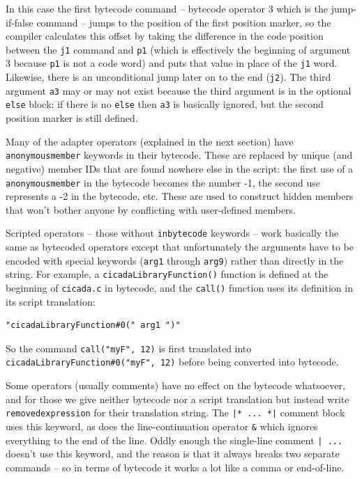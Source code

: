 \documentclass{article}
\newenvironment{code}{
       \begin{list}{}{
               \setlength{\leftmargin}{.4in}
               \setlength{\rightmargin}{0in}
               \setlength{\topsep}{.2in}
       }
       \small
       \item[] }
       { \end{list}   }
\begin{document}
\noindent In this case the first bytecode command -- bytecode operator 3 which is the jump-if-false command -- jumps to the position of the first position marker, so the compiler calculates this offset by taking the difference in the code position between the \verb#j1# command and \verb#p1# (which is effectively the beginning of argument 3 because \verb#p1# is not a code word) and puts that value in place of the \verb#j1# word.  Likewise, there is an unconditional jump later on to the end (\verb#j2#).  The third argument \verb#a3# may or may not exist because the third argument is in the optional \verb#else# block:  if there is no \verb#else# then \verb#a3# is basically ignored, but the second position marker is still defined.

Many of the adapter operators (explained in the next section) have \verb#anonymousmember# keywords in their bytecode.  These are replaced by unique (and negative) member IDs that are found nowhere else in the script:  the first use of a \verb#anonymousmember# in the bytecode becomes the number -1, the second use represents a -2 in the bytecode, etc.  These are used to construct hidden members that won't bother anyone by conflicting with user-defined members.

Scripted operators -- those without \verb#inbytecode# keywords -- work basically the same as bytecoded operators except that unfortunately the arguments have to be encoded with special keywords (\verb#arg1# through \verb#arg9#) rather than directly in the string.  For example, a \verb#cicadaLibraryFunction()# function is defined at the beginning of \verb#cicada.c# in bytecode, and the \verb#call()# function uses its definition in its script translation:

\begin{code} \begin{verbatim}
"cicadaLibraryFunction#0(" arg1 ")"
\end{verbatim} \end{code}

\noindent So the command \verb#call("myF", 12)# is first translated into \verb$cicadaLibraryFunction#0("myF", 12)$ before being converted into bytecode.

Some operators (usually comments) have no effect on the bytecode whatsoever, and for those we give neither bytecode nor a script translation but instead write \verb#removedexpression# for their translation string.  The \verb#|* ... *|# comment block uses this keyword, as does the line-continuation operator \verb#&# which ignores everything to the end of the line.  Oddly enough the single-line comment \verb#| ...# doesn't use this keyword, and the reason is that it always breaks two separate commands -- so in terms of bytecode it works a lot like a comma or end-of-line. 
\end{document}

